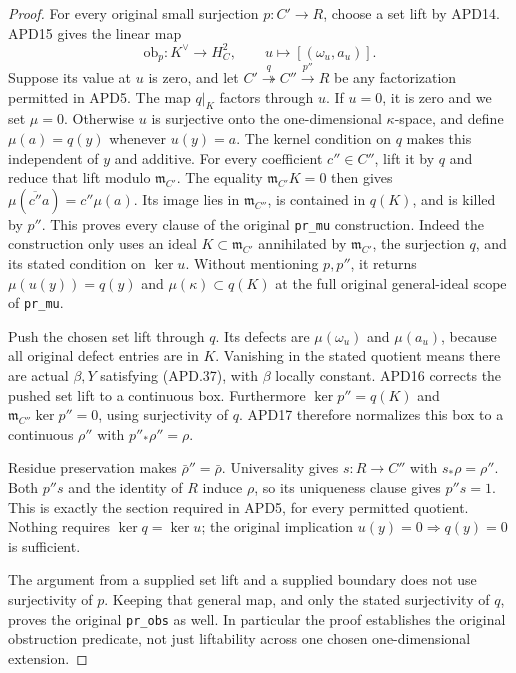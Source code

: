 \begin{proof}
For every original small surjection \(p:C'\to R\), choose
a set lift by APD14.  APD15 gives the linear map
\[
 \mathrm{ob}_p:K^\vee\longrightarrow H_C^2,
 \qquad u\longmapsto[(\omega_u,a_u)].                     \tag{APD.38}
\]
Suppose its value at \(u\) is zero, and let
\(C'\overset q\twoheadrightarrow C''\overset{p''}\to R\)
be any factorization permitted in APD5.  The map \(q|_K\)
factors through \(u\).  If \(u=0\), it is zero and we set
\(\mu=0\).  Otherwise \(u\) is surjective onto the
one-dimensional \(\kappa\)-space, and define
\(\mu(a)=q(y)\) whenever \(u(y)=a\).  The kernel condition
on \(q\) makes this independent of \(y\) and additive.
For every coefficient \(c''\in C''\), lift it by \(q\)
and reduce that lift modulo \(\mathfrak m_{C'}\).
The equality \(\mathfrak m_{C'}K=0\) then gives
\(\mu(\overline{c''}a)=c''\mu(a)\).
Its image lies in \(\mathfrak m_{C''}\), is contained in
\(q(K)\), and is killed by \(p''\).  This proves every
clause of the original \texttt{pr\_mu} construction.
Indeed the construction only uses an ideal
\(K\subset\mathfrak m_{C'}\) annihilated by
\(\mathfrak m_{C'}\), the surjection \(q\), and its stated
condition on \(\ker u\).  Without mentioning \(p,p''\), it
returns \(\mu(u(y))=q(y)\) and
\(\mu(\kappa)\subset q(K)\) at the full original general-ideal
scope of \texttt{pr\_mu}.

Push the chosen set lift through \(q\).  Its defects are
\(\mu(\omega_u)\) and \(\mu(a_u)\), because all original
defect entries are in \(K\).  Vanishing in the stated quotient
means there are actual \(\beta,Y\) satisfying (APD.37), with
\(\beta\) locally constant.  APD16 corrects the pushed set
lift to a continuous box.  Furthermore
\(\ker p''=q(K)\) and
\(\mathfrak m_{C''}\ker p''=0\), using surjectivity of \(q\).
APD17 therefore normalizes this box to a continuous
\(\rho''\) with \(p''_*\rho''=\rho\).

Residue preservation makes \(\bar\rho''=\bar\rho\).
Universality gives \(s:R\to C''\) with \(s_*\rho=\rho''\).
Both \(p''s\) and the identity of \(R\) induce \(\rho\),
so its uniqueness clause gives \(p''s=1\).  This is exactly
the section required in APD5, for every permitted quotient.
Nothing requires \(\ker q=\ker u\); the original implication
\(u(y)=0\Rightarrow q(y)=0\) is sufficient.

The argument from a supplied set lift and a supplied boundary
does not use surjectivity of \(p\).  Keeping that general map,
and only the stated surjectivity of \(q\), proves the original
\texttt{pr\_obs} as well.  In particular the proof establishes
the original obstruction predicate, not just liftability across
one chosen one-dimensional extension.
\end{proof}

